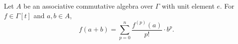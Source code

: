 Let $A$ be an associative commutative algebra over $\Gamma$ with unit element $e$. For $f \in \Gamma[t]$ and $a, b \in A$,
$$f(a+b) = \sum_{p=0}^{n} \frac{f^{(p)}(a)}{p!} \cdot b^p.$$
